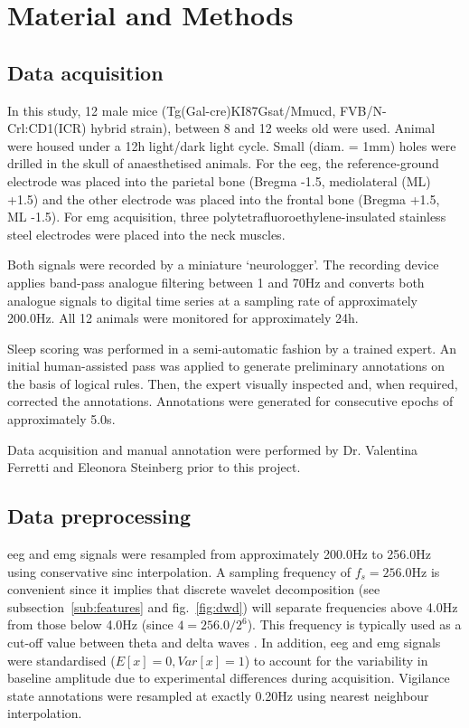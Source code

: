 \section{Material and Methods} \label{matmet}

\subsection{Data acquisition}
In this study, 12 male mice (Tg(Gal-cre)KI87Gsat/Mmucd, FVB/N-Crl:CD1(ICR) hybrid strain),
between 8 and 12 weeks old were used.
Animal were housed under a 12h light/dark light cycle.
Small (diam. = 1mm) holes were drilled in the skull of anaesthetised animals.
For the  \gls{eeg}, the reference-ground electrode was placed into the parietal bone (Bregma -1.5, mediolateral (ML) +1.5) and
the other electrode was placed into the frontal bone (Bregma +1.5, ML -1.5).
For \gls{emg} acquisition, three polytetrafluoroethylene-insulated stainless steel electrodes were placed into the neck muscles.

Both signals were recorded by a miniature `neurologger'\cite{vyssotski_miniature_2006}.
The recording device applies band-pass analogue filtering between 1 and 70Hz and converts both analogue signals to digital time series at a sampling rate of approximately 200.0Hz.
All 12 animals were monitored for approximately 24h.

Sleep scoring was performed in a semi-automatic fashion by a trained expert.
An initial human-assisted pass was applied to generate preliminary annotations on the basis of logical rules\cite{costa-miserachs_automated_2003}.
Then, the expert visually inspected and, when required, corrected the annotations.
Annotations were generated for consecutive epochs of approximately 5.0s.

Data acquisition and manual annotation were performed by Dr. Valentina
Ferretti and Eleonora Steinberg prior to this project.
\subsection{Data preprocessing}

\gls{eeg} and \gls{emg} signals were resampled from approximately 200.0Hz to 256.0Hz using
conservative sinc interpolation\cite{putnam_design_1997}.
A sampling frequency of $f_s  = 256.0$Hz is convenient since it implies that discrete wavelet decomposition (see subsection~\ref{sub:features} and fig.~\ref{fig:dwd}) will separate
frequencies above 4.0Hz from those below 4.0Hz (since $4 = 256.0/{2^6} $).
This frequency is typically used as a cut-off value between theta and delta
waves \cite{vyazovskiy_nrem_2014}.
In addition, \gls{eeg} and \gls{emg} signals were standardised ($E[x] = 0, Var[x] = 1$) to account for the variability in baseline amplitude due to experimental differences during acquisition.
Vigilance state annotations were resampled at exactly 0.20Hz using nearest neighbour interpolation.

